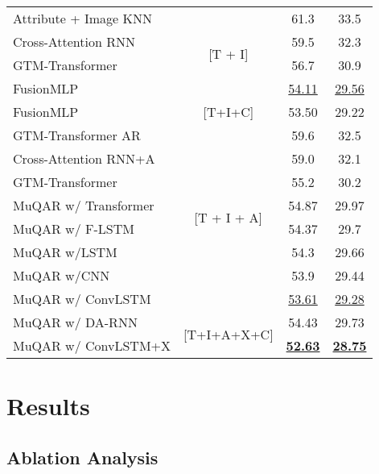\documentclass{article}
\begin{document}
\begin{table*}
\begin{tabular}{l|c|cc}
    \midrule
    
    Attribute + Image KNN  \cite{ekambaram2020attention} & \multirow{4}{*}{[T + I]} & 61.3 & 33.5 \\
    Cross-Attention RNN \cite{ekambaram2020attention} &  & 59.5 & 32.3 \\
    GTM-Transformer \cite{skenderi2021well} &  & 56.7 & 30.9 \\    
    FusionMLP &  & \underline{54.11} & \underline{29.56} \\    
    \midrule
    
    FusionMLP & [T+I+C] & 53.50 & 29.22 \\    
    
    \midrule

    GTM-Transformer AR \cite{skenderi2021well} & \multirow{8}{*}{[T + I + A]} & 59.6 & 32.5 \\    
    
    Cross-Attention RNN+A \cite{ekambaram2020attention} & & 59.0 & 32.1\\
    
    GTM-Transformer \cite{skenderi2021well} & & 55.2 & 30.2 \\    

    MuQAR w/ Transformer & & 54.87 & 29.97\\
    MuQAR w/ F-LSTM & & 54.37 & 29.7 \\    
    MuQAR w/LSTM & & 54.3 & 29.66 \\

    MuQAR w/CNN & & 53.9 & 29.44 \\
    MuQAR w/ ConvLSTM &  & \underline{53.61} & \underline{29.28} \\
    
    \midrule
    MuQAR w/ DA-RNN & \multirow{2}{*}{[T+I+A+X+C]} & 54.43 & 29.73 \\    
    
    MuQAR w/ ConvLSTM+X & & \underline{\textbf{52.63}} & \underline{\textbf{28.75}} \\    
    
    \bottomrule
  \end{tabular}
  
\end{table*}

\section{Results}
\label{section:results}

\subsection{Ablation Analysis}
\label{sec:ablation}
\end{document}
